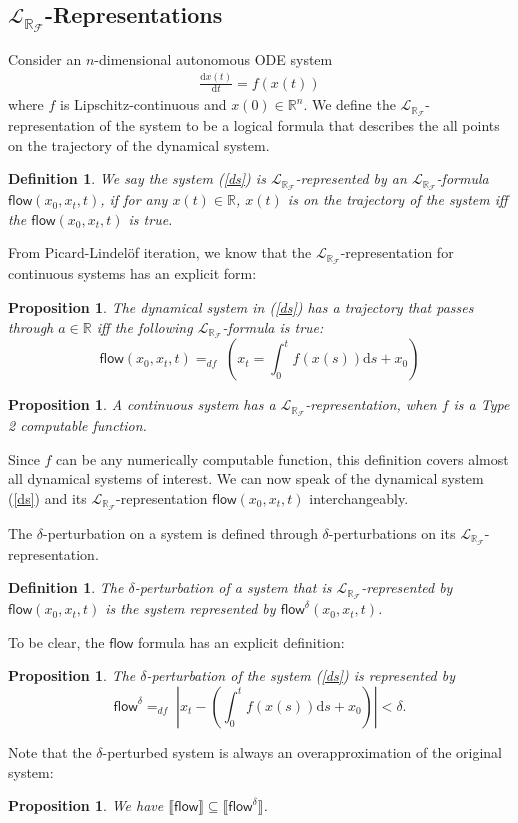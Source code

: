 \documentclass[10pt]{article}
\theoremstyle{plain}
\newtheorem{proposition}[theorem]{Proposition}
\newtheorem{definition}[theorem]{Definition}
\theoremstyle{definition}
\newcommand{\flow}{\mathsf{flow}}
\newcommand{\lrf}{\mathcal{L}_{\mathbb{R}_{\mathcal{F}}}}
\newcommand{\der}{\mathrm{d}}
\begin{document}
\subsection{$\lrf$-Representations}

Consider an $n$-dimensional autonomous ODE system
\begin{eqnarray}\label{ds}
\frac{\der x(t)}{\der t} = f(x(t))
\end{eqnarray}
where $f$ is Lipschitz-continuous and $x(0)\in \mathbb{R}^n$. We define the $\lrf$-representation of the system to be a logical formula that describes the all points on the trajectory of the dynamical system. 
\begin{definition}
We say the system (\ref{ds}) is $\lrf$-represented by an $\lrf$-formula $\flow(x_0, x_t, t)$, if for any $x(t)\in \mathbb{R}$, $x(t)$ is on the trajectory of the system iff the $\flow(x_0, x_t, t)$ is true. 
\end{definition}

From Picard-Lindel\"of iteration, we know that the $\lrf$-representation for continuous systems has an explicit form:

\begin{proposition}
The dynamical system in (\ref{ds}) has a trajectory that passes through $a\in \mathbb{R}$ iff the following $\lrf$-formula is true:
$$\flow(x_0, x_t, t)=_{df}\; (x_t = \int_0^t f(x(s))\der s + x_0)$$
\end{proposition}

\begin{proposition}
A continuous system has a $\lrf$-representation, when $f$ is a Type 2 computable function. 
\end{proposition}

Since $f$ can be any numerically computable function, this definition covers almost all dynamical systems of interest. We can now speak of the dynamical system (\ref{ds}) and its $\lrf$-representation $\flow(x_0, x_t, t)$ interchangeably. 

The $\delta$-perturbation on a system is defined through $\delta$-perturbations on its $\lrf$-representation. 
\begin{definition}
The $\delta$-perturbation of a system that is $\lrf$-represented by $\flow(x_0, x_t, t)$ is the system represented by $\flow^{\delta}(x_0, x_t, t)$. 
\end{definition}
To be clear, the $\flow$ formula has an explicit definition:
\begin{proposition}
The $\delta$-perturbation of the system (\ref{ds}) is represented by 
$$\flow^{\delta} =_{df}\; |x_t- (\int_0^t f(x(s))\der s + x_0)|<\delta.$$
\end{proposition}
Note that the $\delta$-perturbed system is always an overapproximation of the original system:
\begin{proposition}
We have $\llbracket\flow\rrbracket\subseteq \llbracket \flow^{\delta}\rrbracket$. 
\end{proposition}
\end{document}
